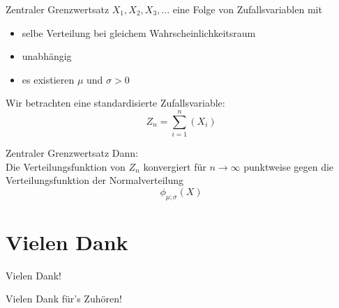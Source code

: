 \documentclass[14pt]{beamer}
\begin{document}


\begin{frame}{Zentraler Grenzwertsatz}
$X_1, X_2, X_3, ...$ eine Folge von Zufallsvariablen mit
\begin{itemize}
\item selbe Verteilung bei gleichem Wahrscheinlichkeitsraum
\item unabhängig
\item es existieren $\mu$ und $\sigma >0$
\end{itemize}
Wir betrachten eine standardisierte Zufallsvariable:
$$ Z_n = \sum_{i = 1}^n(X_i)$$
\end{frame}

\begin{frame}{Zentraler Grenzwertsatz}
Dann:\\
Die Verteilungsfunktion von $Z_n$ konvergiert für $n \to \infty$ punktweise gegen die Verteilungsfunktion der Normalverteilung
$$\phi_{\mu;\sigma}(X)$$

\end{frame}

\section*{Vielen Dank}
\begin{frame}{Vielen Dank!}
\begin{center}
\parskip 15pt
Vielen Dank für's Zuhören!
\end{center}
\end{frame}
\end{document}
